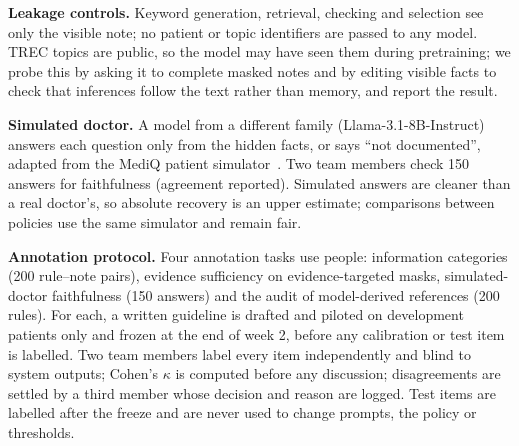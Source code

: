 \documentclass[10pt,a4paper]{article}
\begin{document}
\textbf{Leakage controls.} Keyword generation, retrieval, checking and selection see only the visible note; no patient or topic identifiers are passed to any model. TREC topics are public, so the model may have seen them during pretraining; we probe this by asking it to complete masked notes and by editing visible facts to check that inferences follow the text rather than memory, and report the result.

\textbf{Simulated doctor.} A model from a different family (Llama-3.1-8B-Instruct) answers each question only from the hidden facts, or says ``not documented'', adapted from the MediQ patient simulator~\cite{mediq}. Two team members check 150 answers for faithfulness (agreement reported). Simulated answers are cleaner than a real doctor's, so absolute recovery is an upper estimate; comparisons between policies use the same simulator and remain fair.

\textbf{Annotation protocol.} Four annotation tasks use people: information categories (200 rule--note pairs), evidence sufficiency on evidence-targeted masks, simulated-doctor faithfulness (150 answers) and the audit of model-derived references (200 rules). For each, a written guideline is drafted and piloted on development patients only and frozen at the end of week 2, before any calibration or test item is labelled. Two team members label every item independently and blind to system outputs; Cohen's \(\kappa\) is computed before any discussion; disagreements are settled by a third member whose decision and reason are logged. Test items are labelled after the freeze and are never used to change prompts, the policy or thresholds.

\end{document}
